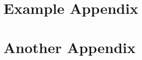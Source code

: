 \chapter{Example Appendix}
\label{chap:appendix}
\lipsum[1]

\chapter{Another Appendix}
\label{chap:appendix2}

\lipsum[1]

\clearpage
